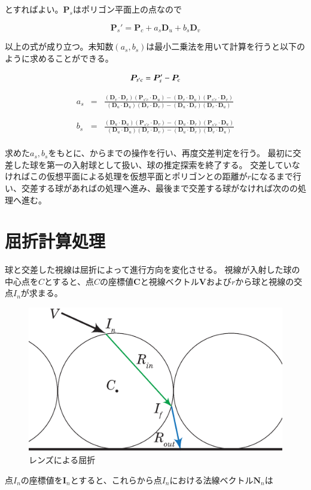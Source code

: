 \noindent
とすればよい。$\bm{P}_s$はポリゴン平面上の点なので

\begin{equation}
\bm{P}_s' = \bm{P}_c + a_s\bm{D}_u + b_s\bm{D}_v 
\label{EPsdash2}
\end{equation}

\noindent
以上の式が成り立つ。未知数$(a_s, b_s)$は最小二乗法を用いて計算を行うと以下のように求めることができる。

\begin{equation}
\bm{P}_{s'c} = \bm{P}_s' - \bm{P}_c\\
\label{EPsdashc}
\end{equation}

\begin{eqnarray}
\label{Eas}
a_s &=& \frac{(\bm{D}_v \cdot \bm{D}_v)(\bm{P}_{s'c} \cdot \bm{D}_u) - (\bm{D}_v \cdot \bm{D}_u)(\bm{P}_{s'c} \cdot \bm{D}_v)}
{(\bm{D}_u \cdot \bm{D}_u)(\bm{D}_v \cdot \bm{D}_v) - (\bm{D}_u \cdot \bm{D}_v)(\bm{D}_v \cdot \bm{D}_u)}\\
\nonumber\\
\nonumber\\
\label{Ebs}
b_s &=& \frac{(\bm{D}_u \cdot \bm{D}_u)(\bm{P}_{s'c} \cdot \bm{D}_v) - (\bm{D}_u \cdot \bm{D}_v)(\bm{P}_{s'c} \cdot \bm{D}_u)}
{(\bm{D}_u \cdot \bm{D}_u)(\bm{D}_v \cdot \bm{D}_v) - (\bm{D}_u \cdot \bm{D}_v)(\bm{D}_v \cdot \bm{D}_u)}
\end{eqnarray}\\
\indent
求めた$a_s, b_s$をもとに、からまでの操作を行い、再度交差判定を行う。
最初に交差した球を第一の入射球として扱い、球の推定探索を終了する。
交差していなければこの仮想平面による処理を仮想平面とポリゴンとの距離が$r$になるまで行い、交差する球があればの処理へ進み、最後まで交差する球がなければ次のの処理へ進む。

\section{屈折計算処理}
\label{SRefraction}

球と交差した視線は屈折によって進行方向を変化させる。
視線が入射した球の中心点を$C$とすると、点$C$の座標値$\bm{C}$と視線ベクトル$\bm{V}$および$r$から球と視線の交点$I_n$が求まる。
\begin{figure}[h]
  \centering
  \includegraphics[width=4.5in]{./img/sphere_refract.eps}
  \caption{レンズによる屈折}
  \label{FSphereRefract}
\end{figure}
点$I_n$の座標値を$\bm{I}_n$とすると、これらから点$I_n$における法線ベクトル$\bm{N}_n$は

